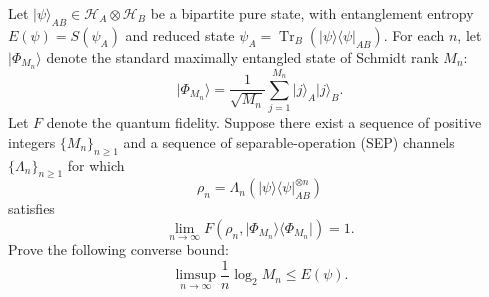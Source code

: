 Let $\lvert \psi\rangle_{AB}\in\mathcal{H}_A\otimes\mathcal{H}_B$ be a bipartite pure state, with entanglement entropy $E(\psi)=S(\psi_A)$ and reduced state $\psi_A=\operatorname{Tr}_B(\lvert \psi\rangle\!\langle \psi\rvert_{AB})$.
For each $n$, let $\lvert \Phi_{M_n}\rangle$ denote the standard maximally entangled state of Schmidt rank
$M_n$:
$$
\lvert \Phi_{M_n}\rangle=\frac{1}{\sqrt{M_n}}\sum_{j=1}^{M_n}\lvert j\rangle_A\lvert j\rangle_B.
$$
Let $F$ denote the quantum fidelity.
Suppose there exist a sequence of positive integers $\{M_n\}_{n\ge1}$ and a sequence of separable-operation (SEP)
channels $\{\Lambda_n\}_{n\ge1}$ for which
$$
\rho_n=\Lambda_n\!\left(\lvert \psi\rangle\!\langle \psi\rvert_{AB}^{\otimes n}\right)
$$
satisfies
$$
\lim_{n\to\infty}F(\rho_n,\lvert \Phi_{M_n}\rangle\!\langle \Phi_{M_n}\rvert)=1.
$$
Prove the following converse bound:
$$
\limsup_{n\to\infty}\frac1n\log_2M_n\le E(\psi).
$$

